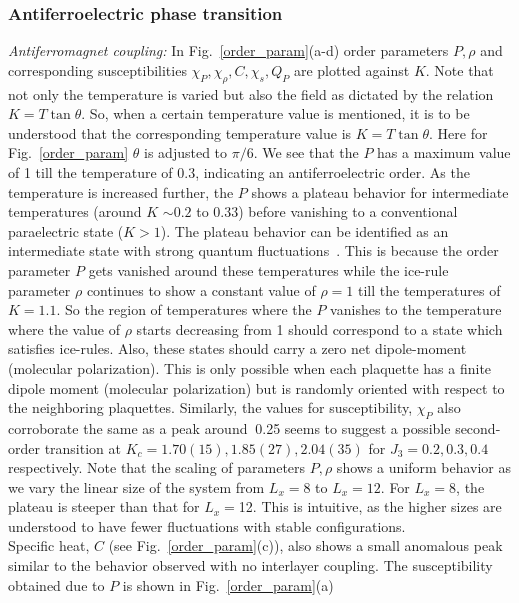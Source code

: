 \subsubsection{Antiferroelectric phase transition}
\indent \indent \textit{Antiferromagnet coupling:} In Fig.~\ref{order_param}(a-d) order parameters $P, \rho$ and corresponding susceptibilities $\chi_P, \chi_\rho, C, \chi_s, Q_P$ are plotted against $K$. Note that not only the temperature is varied but also the field as dictated by the relation $K=T\tan\theta$. So, when a certain temperature value is mentioned, it is to be understood that the corresponding temperature value is $K=T\tan\theta$. Here for Fig.~\ref{order_param} $\theta$ is adjusted to $\pi/6$. We see that the $P$ has a maximum value of 1 till the temperature of 0.3, indicating an antiferroelectric order. As the temperature is increased further, the $P$ shows a plateau behavior for intermediate temperatures (around $K$ $\sim 0.2$ to $0.33$) before vanishing to a conventional paraelectric state ($K>1$). The plateau behavior can be identified as an intermediate state with strong quantum fluctuations~\cite{vijigiri2020dipole,ishizuka2011quantum}. This is because the order parameter $P$ gets vanished around these temperatures while the ice-rule parameter $\rho$ continues to show a constant value of $\rho=1$ till the temperatures of $K=1.1$. So the region of temperatures where the $P$ vanishes to the temperature where the value of $\rho$ starts decreasing from 1 should correspond to a state which satisfies ice-rules. Also, these states should carry a zero net dipole-moment (molecular polarization). This is only possible when each plaquette has a finite dipole moment (molecular polarization) but is randomly oriented with respect to the neighboring plaquettes. Similarly, the values for susceptibility, $\chi_P$ also corroborate the same as a peak around $~$0.25 seems to suggest a possible second-order transition at $K_c=1.70(15), 1.85(27), 2.04(35)$ for $J_3=0.2, 0.3, 0.4$ respectively. Note that the scaling of parameters $P,\rho$ shows a uniform behavior as we vary the linear size of the system from $L_x=8$ to $L_x=12$. For $L_x=8$, the plateau is steeper than that for $L_x=$12. This is intuitive, as the higher sizes are understood to have fewer fluctuations with stable configurations. \\
\indent  Specific heat, $C$ (see Fig.~\ref{order_param}(c)), also shows a small anomalous peak similar to the behavior observed with no interlayer coupling. The susceptibility obtained due to $P$ is shown in Fig.~\ref{order_param}(a)
